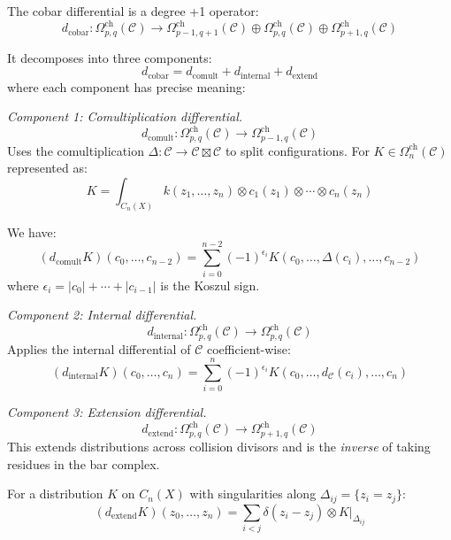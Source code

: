 \begin{theorem}\label{thm:cobar-diff-geom}
The cobar differential is a degree +1 operator:
\[d_{\text{cobar}}: \Omega^{\text{ch}}_{p,q}(\mathcal{C}) \to 
\Omega^{\text{ch}}_{p-1,q+1}(\mathcal{C}) \oplus \Omega^{\text{ch}}_{p,q}(\mathcal{C}) 
\oplus \Omega^{\text{ch}}_{p+1,q}(\mathcal{C})\]

It decomposes into three components:
\[
d_{\text{cobar}} = d_{\text{comult}} + d_{\text{internal}} + d_{\text{extend}}
\]
where each component has precise meaning:

\emph{Component 1: Comultiplication differential.}
\[d_{\text{comult}}: \Omega^{\text{ch}}_{p,q}(\mathcal{C}) \to 
\Omega^{\text{ch}}_{p-1,q}(\mathcal{C})\]
Uses the comultiplication $\Delta: \mathcal{C} \to \mathcal{C} \boxtimes \mathcal{C}$ 
to split configurations. For $K \in \Omega^{\text{ch}}_n(\mathcal{C})$ represented as:
\[K = \int_{C_n(X)} k(z_1, \ldots, z_n) \otimes c_1(z_1) \otimes \cdots \otimes c_n(z_n)\]

We have:
\[(d_{\text{comult}}K)(c_0, \ldots, c_{n-2}) = \sum_{i=0}^{n-2} (-1)^{\epsilon_i} 
K(c_0, \ldots, \Delta(c_i), \ldots, c_{n-2})\]
where $\epsilon_i = |c_0| + \cdots + |c_{i-1}|$ is the Koszul sign.

\emph{Component 2: Internal differential.}
\[d_{\text{internal}}: \Omega^{\text{ch}}_{p,q}(\mathcal{C}) \to 
\Omega^{\text{ch}}_{p,q}(\mathcal{C})\]
Applies the internal differential of $\mathcal{C}$ coefficient-wise:
\[(d_{\text{internal}}K)(c_0, \ldots, c_n) = \sum_{i=0}^n (-1)^{\epsilon_i} 
K(c_0, \ldots, d_{\mathcal{C}}(c_i), \ldots, c_n)\]

\emph{Component 3: Extension differential.}
\[d_{\text{extend}}: \Omega^{\text{ch}}_{p,q}(\mathcal{C}) \to 
\Omega^{\text{ch}}_{p+1,q}(\mathcal{C})\]
This extends distributions across collision divisors and is the \emph{inverse} of taking residues in the bar complex.

For a distribution $K$ on $C_n(X)$ with singularities along $\Delta_{ij} = 
\{z_i = z_j\}$:
\[(d_{\text{extend}}K)(z_0, \ldots, z_n) = \sum_{i < j} \delta(z_i - z_j) \otimes 
K|_{\Delta_{ij}}\]

\end{theorem}

